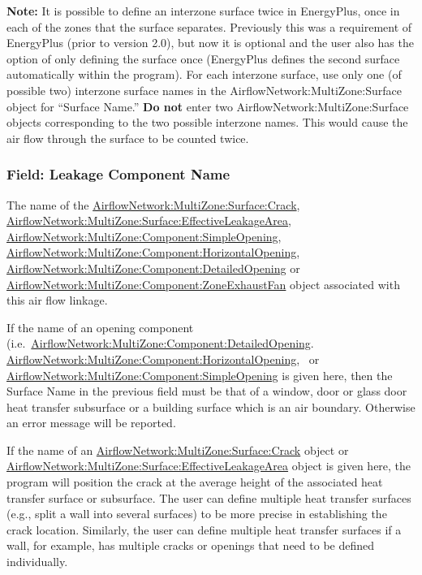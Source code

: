 \textbf{Note:} It is possible to define an interzone surface twice in EnergyPlus, once in each of the zones that the surface separates. Previously this was a requirement of EnergyPlus (prior to version 2.0), but now it is optional and the user also has the option of only defining the surface once (EnergyPlus defines the second surface automatically within the program). For each interzone surface, use only one (of possible two) interzone surface names in the AirflowNetwork:MultiZone:Surface object for ``Surface Name.'' \textbf{Do not} enter two AirflowNetwork:MultiZone:Surface objects corresponding to the two possible interzone names. This would cause the air flow through the surface to be counted twice.

\subsubsection{Field: Leakage Component Name}\label{field-leakage-component-name}

The name of the \hyperref[airflownetworkmultizonesurfacecrack]{AirflowNetwork:MultiZone:Surface:Crack}, \hyperref[airflownetworkmultizonesurfaceeffectiveleakagearea]{AirflowNetwork:MultiZone:Surface:EffectiveLeakageArea}, \hyperref[airflownetworkmultizonecomponentsimpleopening]{AirflowNetwork:MultiZone:Component:SimpleOpening}, \hyperref[airflownetworkmultizonecomponenthorizontalopening]{AirflowNetwork:MultiZone:Component:HorizontalOpening}, \hyperref[airflownetworkmultizonecomponentdetailedopening]{AirflowNetwork:MultiZone:Component:DetailedOpening} or \hyperref[airflownetworkmultizonecomponentzoneexhaustfan]{AirflowNetwork:MultiZone:Component:ZoneExhaustFan} object associated with this air flow linkage.

If the name of an opening component (i.e.~\hyperref[airflownetworkmultizonecomponentdetailedopening]{AirflowNetwork:MultiZone:Component:DetailedOpening}. \hyperref[airflownetworkmultizonecomponenthorizontalopening]{AirflowNetwork:MultiZone:Component:HorizontalOpening},~ or \hyperref[airflownetworkmultizonecomponentsimpleopening]{AirflowNetwork:MultiZone:Component:SimpleOpening} is given here, then the Surface Name in the previous field must be that of a window, door or glass door heat transfer subsurface or a building surface which is an air boundary. Otherwise an error message will be reported.

If the name of an \hyperref[airflownetworkmultizonesurfacecrack]{AirflowNetwork:MultiZone:Surface:Crack} object or \hyperref[airflownetworkmultizonesurfaceeffectiveleakagearea]{AirflowNetwork:MultiZone:Surface:EffectiveLeakageArea} object is given here, the program will position the crack at the average height of the associated heat transfer surface or subsurface. The user can define multiple heat transfer surfaces (e.g., split a wall into several surfaces) to be more precise in establishing the crack location. Similarly, the user can define multiple heat transfer surfaces if a wall, for example, has multiple cracks or openings that need to be defined individually.

